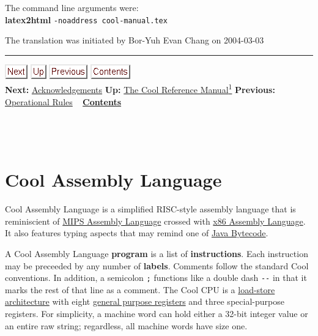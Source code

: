 \documentclass[]{article}
\begin{document}
The command line arguments were: \\ \textbf{latex2html}
\texttt{-noaddress cool-manual.tex}

The translation was initiated by Bor-Yuh Evan Chang on 2004-03-03 \\

\begin{center}\rule{3in}{0.4pt}\end{center}

\href{node33.html}{\includegraphics{next.png}}
\href{cool-manual.html}{\includegraphics{up.png}}
\href{node31.html}{\includegraphics{prev.png}}
\href{node1.html}{\includegraphics{contents.png}} \\ \textbf{Next:}
\href{node49.html}{Acknowledgements} \textbf{Up:}
\href{cool-manual.html}{The Cool Reference Manual\textsuperscript{1}}
\textbf{Previous:} \href{node48.html}{Operational Rules} ~
\textbf{\href{node1.html}{Contents}} \\ \\

\section{\\ Cool Assembly Language}

Cool Assembly Language is a simplified RISC-style assembly language that
is reminiscient of
\href{http://en.wikipedia.org/wiki/MIPS_architecture\#MIPS_assembly_language}{MIPS
Assembly Language} crossed with
\href{http://en.wikipedia.org/wiki/X86_assembly_language}{x86 Assembly
Language}. It also features typing aspects that may remind one of
\href{http://en.wikipedia.org/wiki/Java_bytecode}{Java Bytecode}.

A Cool Assembly Language \textbf{program} is a list of
\textbf{instructions}. Each instruction may be preceeded by any number
of \textbf{labels}. Comments follow the standard Cool conventions. In
addition, a semicolon \texttt{;} functions like a double dash
\texttt{-{}-} in that it marks the rest of that line as a comment. The
Cool CPU is a \href{http://en.wikipedia.org/wiki/RISC}{load-store
architecture} with eight
\href{http://en.wikipedia.org/wiki/General_purpose_register}{general
purpose registers} and three special-purpose registers. For simplicity,
a machine word can hold either a 32-bit integer value or an entire raw
string; regardless, all machine words have size one.
\end{document}
